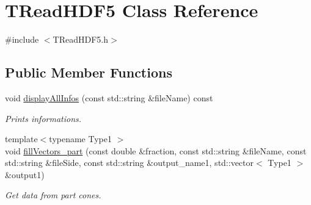 \hypertarget{classTReadHDF5}{\section{T\-Read\-H\-D\-F5 Class Reference}
\label{classTReadHDF5}
}


{\ttfamily \#include $<$T\-Read\-H\-D\-F5.\-h$>$}

\subsection*{Public Member Functions}
\begin{DoxyCompactItemize}
\item 
void \hyperlink{classTReadHDF5_a6ab4eea431df35b9dd508413dcab5886}{display\-All\-Infos} (const std\-::string \&file\-Name) const 
\begin{DoxyCompactList}\small\item\em Prints informations. \end{DoxyCompactList}\item 
{\footnotesize template$<$typename Type1 $>$ }\\void \hyperlink{classTReadHDF5_addea7c947cd2d922f464ff54aa1450d3}{fill\-Vectors\-\_\-part} (const double \&fraction, const std\-::string \&file\-Name, const std\-::string \&file\-Side, const std\-::string \&output\-\_\-name1, std\-::vector$<$ Type1 $>$ \&output1)
\begin{DoxyCompactList}\small\item\em Get data from part cones. \end{DoxyCompactList}\end{DoxyCompactItemize}
